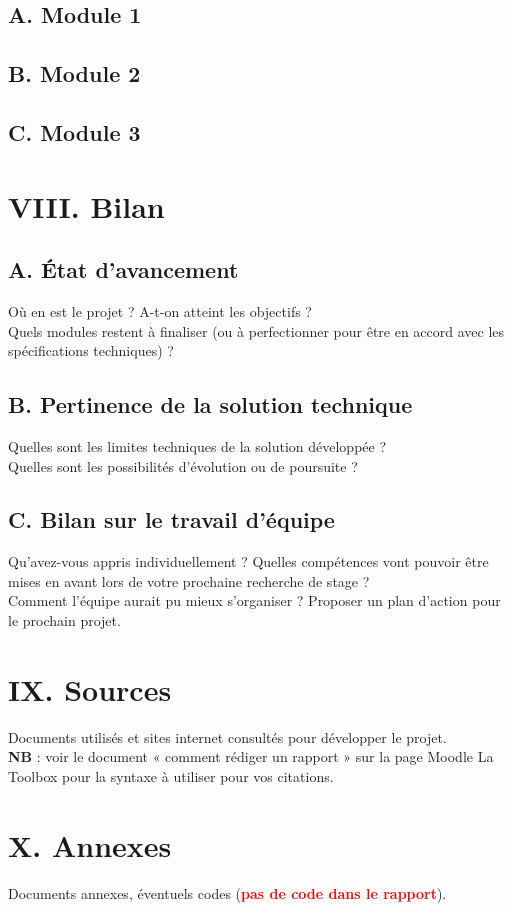 \documentclass[a4paper,11pt]{book}
\begin{document}
\vspace{3mm}

\subsection*{A. Module 1}
\subsection*{B. Module 2}
\subsection*{C. Module 3}

\newpage
\section*{VIII. Bilan}
\subsection*{A. État d'avancement}
Où en est le projet ? A-t-on atteint les objectifs ?\\
\noindent Quels modules restent à finaliser (ou à perfectionner pour être en accord avec les spécifications techniques) ?

\subsection*{B. Pertinence de la solution technique}
Quelles sont les limites techniques de la solution développée ? \\
\noindent Quelles sont les possibilités d’évolution ou de poursuite ?


\subsection*{C. Bilan sur le travail d'équipe}
Qu’avez-vous appris individuellement ? Quelles compétences vont pouvoir être mises en avant lors de votre prochaine recherche de stage ?
\\
\noindent Comment l’équipe aurait pu mieux s’organiser ? Proposer un plan d’action pour le prochain projet.



\newpage
\section*{IX. Sources}
Documents utilisés et sites internet consultés pour développer le projet.\\
\noindent \textbf{NB} : voir le document « comment rédiger un rapport » sur la page Moodle La Toolbox pour la syntaxe à utiliser pour vos citations.



\newpage
\section*{X. Annexes}
Documents annexes, éventuels codes (\textbf{\textcolor{red}{pas de code dans le rapport}}).
\end{document}
